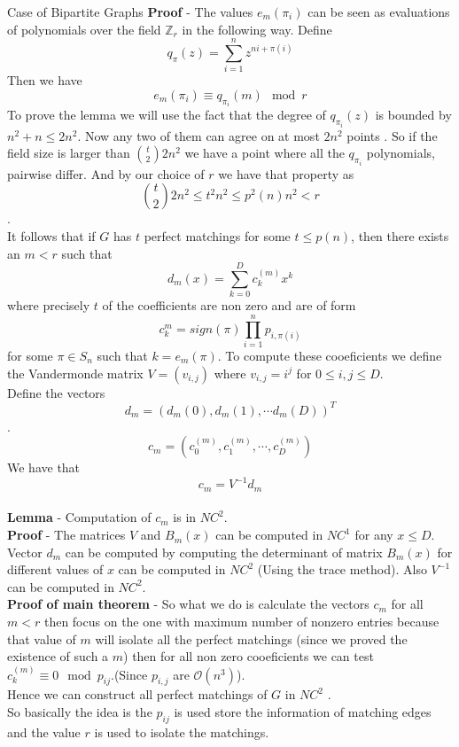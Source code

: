 \documentclass{beamer}
\begin{document}
\begin{frame}[allowframebreaks]{Case of Bipartite Graphs}
		\textbf{Proof} - The values $e_m(\pi_i)$ can be seen as evaluations of polynomials over the field $\mathbb{Z}_r$ in the following way. Define $$q_{\pi}(z)= \sum_{i=1}^{n}z^{ni+\pi(i)}$$
		Then we have $$e_m(\pi_i)\equiv q_{\pi_i}(m) \mod r$$
		To prove the lemma we will use the fact that the degree of $q_{\pi_i}(z)$ is bounded by $n^2+n\leq 2n^2$. Now any two of them can agree on at most $2n^2$ points . So if the field size is larger than ${t\choose 2} 2n^2$ we have a point where all the $q_{\pi_i}$ polynomials, pairwise differ. And by our choice of $r$ we have that property as 
		$${t\choose 2 } 2n^2 \leq t^2n^2\leq p^2(n)n^2<r$$.
		\\
		It follows that if $G$ has $t$ perfect matchings for some $t\leq p(n)$, then there exists an $m<r$ such that $$d_{m}(x)=\sum_{k=0}^{D}c_{k}^{(m)} x^k$$
		where precisely $t$ of the coefficients are non zero and are of form $$c_{k}^{m}=sign(\pi)\prod_{i=1}^{n} p_{i,\pi(i)}$$
		for some $\pi \in S_n$ such that $k=e_m(\pi)$. To compute these cooeficients we define the Vandermonde matrix $V=(v_{i,j})$ where $v_{i,j}=i^j$ for $0\leq i,j \leq D$.
		\\
		Define the vectors $$d_m=(d_m(0),d_m(1),\cdots d_m(D))^T$$.
		$$c_m=(c_{0}^{(m)},c_{1}^{(m)}, \cdots, c_{D}^{(m)})$$
		We have that $$c_m=V^{-1} d_m$$\\
		\textbf{Lemma} - Computation of $c_m$ is in $NC^2$.
		\\ \textbf{Proof} - The matrices $V$ and $B_m(x)$ can be computed in $NC^1$ for any $x \leq D$. Vector $d_m$ can be computed by computing the determinant of matrix $B_{m}(x)$ for different values of $x$ can be computed in $NC^2$ (Using the trace method). Also $V^{-1}$ can be computed in $NC^2$.\\
		\textbf{Proof of main theorem} - So what we do is calculate the vectors $c_m$ for all $m<r$ then focus on the one with maximum number of nonzero entries because that value of $m$ will isolate all the perfect matchings (since we proved the existence of such a $m$) then for all non zero cooeficients we can test $c_{k}^{(m)} \equiv 0 \mod p_{ij}$.(Since $p_{i,j}$ are $\mathcal{O}(n^3)$). 
		\\Hence we can construct all perfect matchings of $G$ in $NC^2$ .
		\\So basically the idea is the $p_{ij}$ is used store the information of matching edges and the value $r$ is used to isolate the matchings.
		
		
\end{frame}
\end{document}

